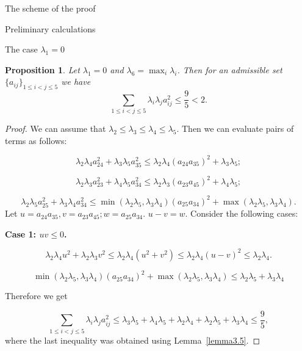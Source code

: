 \documentclass[12pt]{article}
\newtheorem{proposition}{Proposition}[section]
\begin{document}
\begin{section}{The scheme of the proof}
\begin{section}{Preliminary calculations}
    
\end{section}



\begin{section}{The case  \texorpdfstring{$\lambda_{1} = 0$}{Lg}}
\label{s5}

\begin{proposition}
\label{lambda-zero-case}
    Let $  \lambda_{1}=0$ and $\lambda_{6} = \max_{i}\lambda_{i}$. Then for an admissible set $\{a_{ij}\}_{1\leq i<j\leq 5}$ we have
    $$
        \sum_{1\leq i < j\leq 5}\lambda_{i}\lambda_{j} a_{ij}^{2} \leq \frac{9}{5}<2.
    $$
\end{proposition}

\begin{proof}
    We can assume that $\lambda_{2}\leq \lambda_{3}\leq \lambda_{4} \leq \lambda_{5}.$  Then we can evaluate pairs of terms as follows:
    
    $$
        \lambda_{2}\lambda_{4}a_{24}^{2} + \lambda_{3}\lambda_{5}a_{35}^{2} \leq \lambda_{2}\lambda_{4}(a_{24}a_{35})^{2} + \lambda_{3}\lambda_{5};
    $$

       $$
        \lambda_{2}\lambda_{3}a_{23}^{2} + \lambda_{4}\lambda_{5}a_{34}^{2} \leq \lambda_{2}\lambda_{3}(a_{23}a_{45})^{2} + \lambda_{4}\lambda_{5};
    $$

    $$
        \lambda_{2}\lambda_{5}a_{25}^{2} + \lambda_{3}\lambda_{4}a_{34}^{2} \leq \min(\lambda_{2}\lambda_{5},\lambda_{3}\lambda_{4} )(a_{25}a_{34})^{2} + \max(\lambda_{2}\lambda_{5},\lambda_{3}\lambda_{4} ).
    $$
    Let $u=a_{24}a_{35}, v = a_{23}a_{45}; w = a_{25}a_{34}.$ $u-v=w.$  Consider the following cases:
    
    \textbf{Case 1: $uv\leq 0$.} 

    $$
        \lambda_{2}\lambda_{4}u^{2} + \lambda_{2}\lambda_{3}v^{2} \leq   \lambda_{2}\lambda_{4}(u^{2} + v^{2}) \leq \lambda_{2}\lambda_{4}(u - v)^{2} \leq \lambda_{2}\lambda_{4}.
    $$

    $$
     \min(\lambda_{2}\lambda_{5},\lambda_{3}\lambda_{4} )(a_{25}a_{34})^{2} + \max(\lambda_{2}\lambda_{5},\lambda_{3}\lambda_{4} ) \leq \lambda_{2}\lambda_{5} + \lambda_{3}\lambda_{4}
    $$

    Therefore we get
    
    $$
        \sum_{1\leq i < j\leq 5}\lambda_{i}\lambda_{j} a_{ij}^{2} \leq \lambda_{3}\lambda_{5} + \lambda_{4}\lambda_{5} + \lambda_{2}\lambda_{4} + \lambda_{2}\lambda_{5} + \lambda_{3}\lambda_{4}\leq \frac{9}{5},
    $$
    where the last inequality was obtained using Lemma~\ref{lemma3.5}. 
    

\end{proof}
\end{section}
\end{section}
\end{document}
